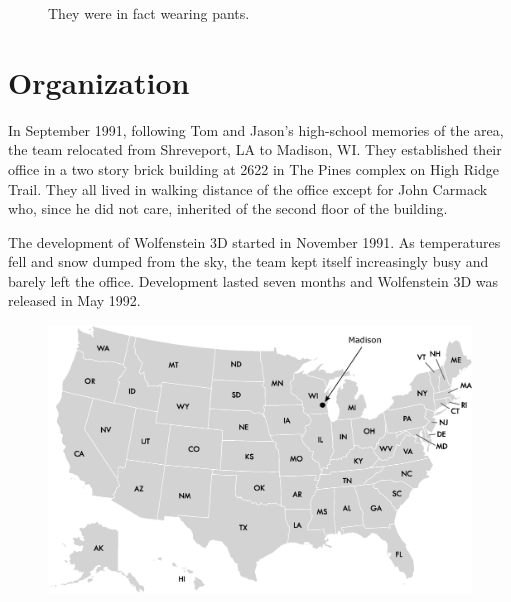 \documentclass[book.tex]{subfiles}
\begin{document}
\begin{figure}[H]
\centering
  
    
\caption{They were in fact wearing pants.}
\label{fig:id_team_1993}
\end{figure}

\section{Organization}

In September 1991, following Tom and Jason's high-school memories of the area, the team relocated from Shreveport, LA to Madison, WI. They established their office in a two story brick building at 2622 in The Pines complex on High Ridge Trail. They all lived in walking distance of the office except for John Carmack who, since he did not care, inherited of the second floor of the building.\\
\par
The development of Wolfenstein 3D started in November 1991. As temperatures fell and snow dumped from the sky, the team kept itself increasingly busy and barely left the office. Development lasted seven months and Wolfenstein 3D was released in May 1992.

\begin{figure}[H]
\centering
 \includegraphics[width=\textwidth]{imgs/drawings/map/usa-id-software.eps}
 \end{figure}


\par
\end{document}
